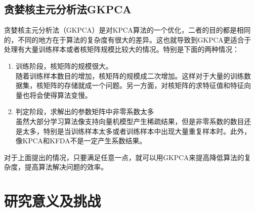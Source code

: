 \documentclass[10pt,a4paper]{article}
\begin{document}
\begin{CJK*}{UTF8}{song}
\subsection{贪婪核主元分析法GKPCA}
贪婪核主元分析法（GKPCA）是对KPCA算法的一个优化，二者的目的都是相同的，不同的地方在于算法的复杂度有很大的差异。这也就导致到GKPCA更适合于处理有大量训练样本或者核矩阵规模比较大的情况。特别是下面的两种情况：
\begin{enumerate}
\item 训练阶段，核矩阵的规模很大。\\
随着训练样本数目的增加，核矩阵的规模成二次增加。这样对于大量的训练数据集，核矩阵的存储就成一个问题。另一方面，对核矩阵的求特征值和特征向量也将会使得算法变慢。
\item 判定阶段，求解出的参数矩阵中非零系数太多\\
虽然大部分学习算法像支持向量机模型产生稀疏结果，但是非零系数的数目还是太多，特别是当训练样本太多或者训练样本中出现大量重复样本时。此外，像KPCA和KFDA不是一定产生系数结果。
\end{enumerate}
对于上面提出的情况，只要满足任意一点，就可以用GKPCA来提高降低算法的复杂度，提高算法解决问题的效率。



\newpage
\section{研究意义及挑战}

\end{CJK*}
\end{document}
